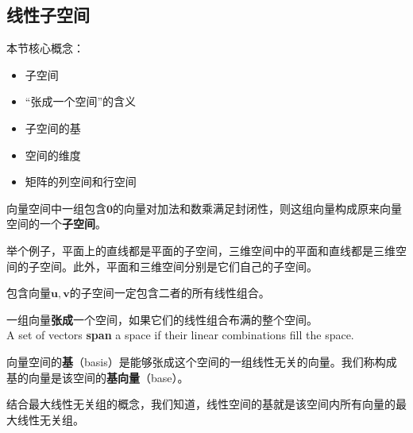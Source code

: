 \subsection{线性子空间}
\label{subsec:线性子空间}

\begin{note}
    本节核心概念：
    \begin{itemize}
        \item 子空间
        \item “张成一个空间”的含义
        \item 子空间的基
        \item 空间的维度
        \item 矩阵的列空间和行空间
    \end{itemize}
\end{note}

\begin{definition}
    向量空间中一组包含$\boldsymbol{0}$的向量对加法和数乘满足封闭性，则这组向量构成原来向量空间的一个\textcolor{third}{\bf 子空间}。
\end{definition}

举个例子，平面上的直线都是平面的子空间，三维空间中的平面和直线都是三维空间的子空间。此外，平面和三维空间分别是它们自己的子空间。

\begin{proposition}
    包含向量$\boldsymbol{u},\boldsymbol{v}$的子空间一定包含二者的所有线性组合。
\end{proposition}

\begin{definition}
    一组向量\textcolor{third}{\bf 张成}一个空间，如果它们的线性组合布满的整个空间。\\
    A set of vectors \textcolor{third}{\bf span} a space if their linear combinations fill the space.
\end{definition}

\begin{definition}[基和基向量]
向量空间的\textcolor{third}{\bf 基}（basis）是能够张成这个空间的一组线性无关的向量。我们称构成基的向量是该空间的\textcolor{third}{\bf 基向量}（base）。
\end{definition}

\vspace{0.3cm}

\begin{note}
    结合最大线性无关组的概念，我们知道，线性空间的基就是该空间内所有向量的最大线性无关组。
\end{note}

